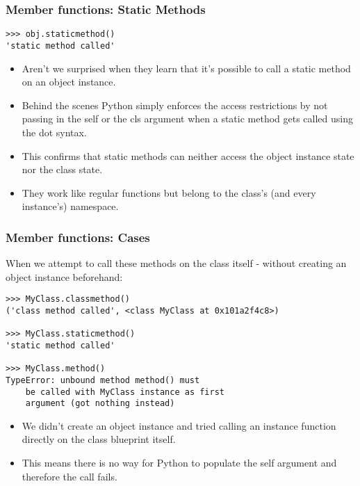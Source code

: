 \begin{frame}[fragile]\frametitle{Member functions: Static Methods}

\begin{lstlisting}
>>> obj.staticmethod()
'static method called'
\end{lstlisting}

  \begin{itemize}
  \item Aren't we surprised when they learn that it's possible to call a static method on an object instance.
  \item Behind the scenes Python simply enforces the access restrictions by not passing in the self or the cls argument when a static method gets called using the dot syntax.
  \item This confirms that static methods can neither access the object instance state nor the class state. 
  \item They work like regular functions but belong to the class's (and every instance's) namespace.
  \end{itemize}
\end{frame}


\begin{frame}[fragile]\frametitle{Member functions: Cases}
When we attempt to call these methods on the class itself - without creating an object instance beforehand:
\begin{lstlisting}
>>> MyClass.classmethod()
('class method called', <class MyClass at 0x101a2f4c8>)

>>> MyClass.staticmethod()
'static method called'

>>> MyClass.method()
TypeError: unbound method method() must
    be called with MyClass instance as first
    argument (got nothing instead)
\end{lstlisting}

  \begin{itemize}
  \item We didn't create an object instance and tried calling an instance function directly on the class blueprint itself. 
  \item This means there is no way for Python to populate the self argument and therefore the call fails.
  \end{itemize}
\end{frame}

